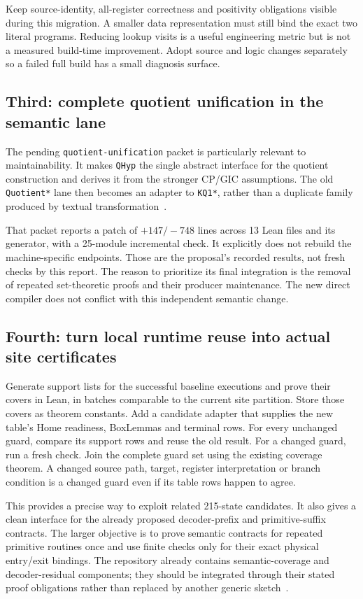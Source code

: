 \documentclass[11pt]{article}
\theoremstyle{definition}\newtheorem{definition}[theorem]{Definition}
\newcommand{\code}[1]{\texttt{#1}}
\begin{document}
Keep source-identity, all-register correctness and positivity obligations
visible during this migration. A smaller data representation must still bind
the exact two literal programs. Reducing lookup visits is a useful engineering
metric but is not a measured build-time improvement. Adopt source and logic
changes separately so a failed full build has a small diagnosis surface.

\subsection{Third: complete quotient unification in the semantic lane}

The pending \code{quotient-unification} packet is particularly relevant to
maintainability. It makes \code{QHyp} the single abstract interface for the
quotient construction and derives it from the stronger CP/GIC assumptions.
The old \code{Quotient*} lane then becomes an adapter to \code{KQ1*}, rather
than a duplicate family produced by textual transformation~\cite{quotient}.

That packet reports a patch of $+147/-748$ lines across 13 Lean files and its
generator, with a 25-module incremental check. It explicitly does not rebuild
the machine-specific endpoints. Those are the proposal's recorded results,
not fresh checks by this report. The reason to prioritize its final integration
is the removal of repeated set-theoretic proofs and their producer maintenance.
The new direct compiler does not conflict with this independent semantic change.

\subsection{Fourth: turn local runtime reuse into actual site certificates}

Generate support lists for the successful baseline executions and prove their
covers in Lean, in batches comparable to the current site partition. Store
those covers as theorem constants. Add a candidate adapter that supplies the
new table's Home readiness, BoxLemmas and terminal rows. For every unchanged
guard, compare its support rows and reuse the old result. For a changed guard,
run a fresh check. Join the complete guard set using the existing coverage
theorem. A changed source path, target, register interpretation or branch
condition is a changed guard even if its table rows happen to agree.

This provides a precise way to exploit related 215-state candidates. It also
gives a clean interface for the already proposed decoder-prefix and
primitive-suffix contracts. The larger objective is to prove semantic
contracts for repeated primitive routines once and use finite checks only
for their exact physical entry/exit bindings. The repository already contains
semantic-coverage and decoder-residual components; they should be integrated
through their stated proof obligations rather than replaced by another generic
sketch~\cite{priorindex}.
\end{document}
